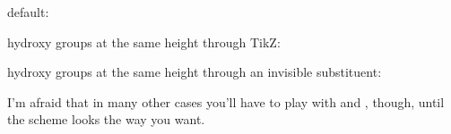 \documentclass[toc=index,DIV10]{cnpkgdoc}
\begin{document}
\begin{beispiel}
 \makevisible
 default:
 \begin{rxn}
  \chemand
 \end{rxn}
 hydroxy groups at the same height through TikZ:
 \begin{rxn}
  \chemand[,,yshift=-1.2em]
 \end{rxn}
 hydroxy groups at the same height through an invisible substituent:
 \begin{rxn}
  \chemand
 \end{rxn}
\end{beispiel}

I'm afraid that in many other cases you'll have to play with  and
, though, until the scheme looks the way you want.
\end{document}
